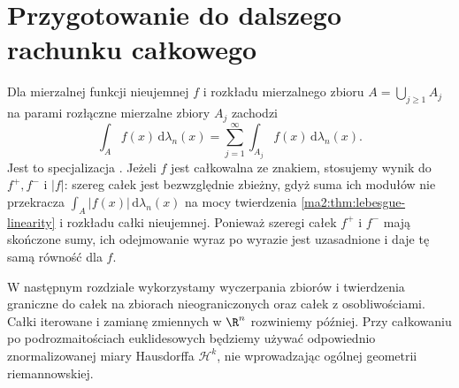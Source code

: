 \section{Przygotowanie do dalszego rachunku całkowego}

Dla mierzalnej funkcji nieujemnej $f$ i rozkładu
mierzalnego zbioru $A=\bigcup_{j\ge1}A_j$
na parami rozłączne mierzalne zbiory $A_j$
zachodzi
\[
 \int_A f(x)\,\mathrm d\lambda_n(x)
 =\sum_{j=1}^\infty\int_{A_j} f(x)\,\mathrm d\lambda_n(x).
\]
Jest to specjalizacja
.
Jeżeli $f$ jest całkowalna ze znakiem,
stosujemy wynik do $f^+,f^-$ i $|f|$:
szereg całek jest bezwzględnie zbieżny,
gdyż suma ich modułów nie przekracza
$\int_A |f(x)|\,\mathrm d\lambda_n(x)$
na mocy twierdzenia \ref{ma2:thm:lebesgue-linearity}
i rozkładu całki nieujemnej. Ponieważ szeregi
całek $f^+$ i $f^-$ mają skończone sumy,
ich odejmowanie wyraz po wyrazie jest uzasadnione
i daje tę samą równość dla $f$.

W następnym rozdziale wykorzystamy wyczerpania
zbiorów i twierdzenia graniczne do całek
na zbiorach nieograniczonych oraz całek
z osobliwościami. Całki iterowane i zamianę
zmiennych w $\R^n$ rozwiniemy później.
Przy całkowaniu po podrozmaitościach
euklidesowych będziemy używać odpowiednio
znormalizowanej miary Hausdorffa $\mathcal H^k$,
nie wprowadzając ogólnej geometrii riemannowskiej.
